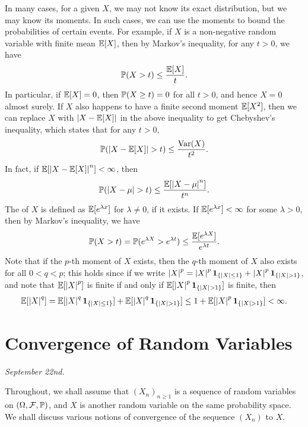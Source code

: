 In many cases, for a given $X$, we may not know its exact distribution, but we may know its moments. In such cases, we can use the moments to bound the probabilities of certain events. For example, if $X$ is a non-negative random variable with finite mean $\mathbb{E}[X]$, then by Markov's inequality, for any $t > 0$, we have
\begin{align}
    \mathbb{P}(X > t) \leq \frac{\mathbb{E}[X]}{t}.
\end{align}
In particular, if $\mathbb{E}[X] = 0$, then $\mathbb{P}(X \geq t) = 0$ for all $t > 0$, and hence $X = 0$ almost surely. If $X$ also happens to have a finite second moment $\mathbb{E}[X^{2}]$, then we can replace $X$ with $\left| X-\mathbb{E}[X] \right|$ in the above inequality to get Chebyshev's inequality, which states that for any $t > 0$,
\begin{align}
    \mathbb{P}(\left| X - \mathbb{E}[X] \right| > t) \leq \frac{\operatorname{Var}(X)}{t^{2}}.
\end{align}
In fact, if $\mathbb{E}[\left| X-\mathbb{E}[X] \right|^{n}] < \infty$, then
\begin{align}
    \mathbb{P}(\left| X-\mu \right| > t) \leq \frac{\mathbb{E}[\left| X-\mu \right|^{n}]}{t^{n}}.
\end{align}
The  of $X$ is defined as $\mathbb{E}[e^{\lambda x}]$ for $\lambda \neq 0$, if it exists. If $\mathbb{E}[e^{\lambda x}] < \infty$ for some $\lambda > 0$, then by Markov's inequality, we have
\begin{align}
    \mathbb{P}(X > t) = \mathbb{P}(e^{\lambda X} > e^{\lambda t}) \leq \frac{\mathbb{E}[e^{\lambda X}]}{e^{\lambda t}}.
\end{align}
Note that if the $p$-th moment of $X$ exists, then the $q$-th moment of $X$ also exists for all $0 < q < p$; this holds since if we write $\left| X \right|^{p} = \left| X \right|^{p}\textbf{1}_{\{\left| X \right| \leq 1\}} + \left| X \right|^{p}\textbf{1}_{\{\left| X \right| > 1\}}$, and note that $\mathbb{E}[\left| X \right|^{p}]$ is finite if and only if $\mathbb{E}[\left| X \right|^{p}\textbf{1}_{\{\left| X \right| > 1\}}]$ is finite, then
\begin{align}
    \mathbb{E}[\left| X \right|^{q}] = \mathbb{E}[\left| X \right|^{q}\textbf{1}_{\{\left| X \right| \leq 1\}}] + \mathbb{E}[\left| X \right|^{q}\textbf{1}_{\{\left| X \right| > 1\}}] \leq 1 + \mathbb{E}[\left| X \right|^{p}\textbf{1}_{\{\left| X \right| > 1\}}] < \infty.
\end{align}

\section{Convergence of Random Variables}
\textit{September 22nd.}

Throughout, we shall assume that $(X_{n})_{n \geq 1}$ is a sequence of random variables on $(\Omega,\mathcal{F},\mathbb{P})$, and $X$ is another random variable on the same probability space. We shall discuss various notions of convergence of the sequence $(X_{n})$ to $X$.

